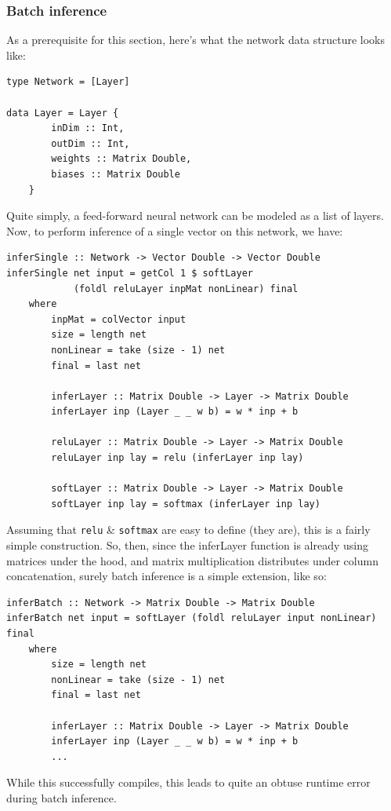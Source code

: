 \documentclass[12pt]{article}
\begin{document}
\subsubsection{Batch inference}
As a prerequisite for this section, here's what the network data structure looks like:
\begin{lstlisting}
type Network = [Layer]

data Layer = Layer {
		inDim :: Int,
		outDim :: Int,
		weights :: Matrix Double,
		biases :: Matrix Double
	}
\end{lstlisting}
Quite simply, a feed-forward neural network can be modeled as a list of layers. Now, to perform inference of a single vector on this network, we have:
\begin{lstlisting}
inferSingle :: Network -> Vector Double -> Vector Double
inferSingle net input = getCol 1 $ softLayer 
			(foldl reluLayer inpMat nonLinear) final
	where
		inpMat = colVector input
		size = length net
		nonLinear = take (size - 1) net
		final = last net

		inferLayer :: Matrix Double -> Layer -> Matrix Double
		inferLayer inp (Layer _ _ w b) = w * inp + b

		reluLayer :: Matrix Double -> Layer -> Matrix Double
		reluLayer inp lay = relu (inferLayer inp lay)

		softLayer :: Matrix Double -> Layer -> Matrix Double
		softLayer inp lay = softmax (inferLayer inp lay)
\end{lstlisting}
Assuming that \verb|relu| \& \verb|softmax| are easy to define (they are), this is a fairly simple construction. So, then, since the inferLayer function is already using matrices under the hood, and matrix multiplication distributes under column concatenation, surely batch inference is a simple extension, like so:
\begin{lstlisting}
inferBatch :: Network -> Matrix Double -> Matrix Double
inferBatch net input = softLayer (foldl reluLayer input nonLinear) final
	where
		size = length net
		nonLinear = take (size - 1) net
		final = last net

		inferLayer :: Matrix Double -> Layer -> Matrix Double
		inferLayer inp (Layer _ _ w b) = w * inp + b
		...
\end{lstlisting}
While this successfully compiles, this leads to quite an obtuse runtime error during batch inference.\medskip
\end{document}
